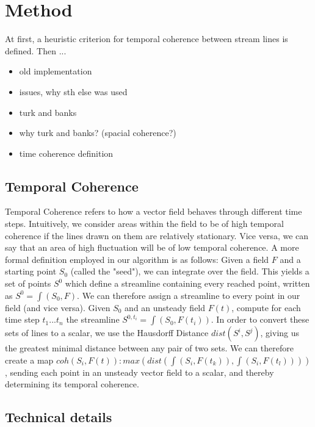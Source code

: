 \chapter{Method}

At first, a heuristic criterion for temporal coherence between stream lines is defined.
Then ...


\begin{itemize}
    \item old implementation
    \item issues, why sth else was used
    \item turk and banks
    \item why turk and banks? (spacial coherence?)
    \item time coherence definition
\end{itemize}


\section{Temporal Coherence}
Temporal Coherence refers to how a vector field behaves through different time steps.
Intuitively, we consider areas within the field to be of high temporal coherence if the lines drawn on them are relatively stationary.
Vice versa, we can say that an area of high fluctuation will be of low temporal coherence.
A more formal definition employed in our algorithm is as follows:
Given a field $F$ and a starting point $S_0$ (called the "seed"), we can integrate over the field.
This yields a set of points $S^0$ which define a streamline containing every reached point, written as $S^0 = \int(S_0, F)$.
We can therefore assign a streamline to every point in our field (and vice versa).
Given $S_0$ and an unsteady field $F(t)$, compute for each time step $t_1...t_n$ the streamline $S^{0,t_i} = \int(S_0, F(t_i))$.
In order to convert these sets of lines to a scalar, we use the Hausdorff Distance $dist(S^i,S^j)$,
giving us the greatest minimal distance between any pair of two sets.
We can therefore create a map $coh(S_i, F(t)): max(dist(\int(S_i, F(t_k)), \int(S_i, F(t_l))))$,
sending each point in an unsteady vector field to a scalar, and thereby determining its temporal coherence.


\section{Technical details}
